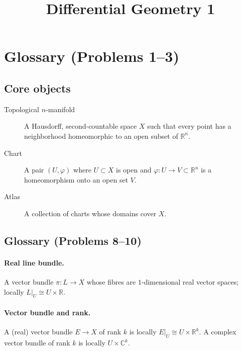 \documentclass[12pt,a4paper]{article}
\title{Differential Geometry 1}
\author{}
\date{}
\theoremstyle{plain}
\theoremstyle{definition}      %
\begin{document}
	\maketitle


\section*{Glossary (Problems 1--3)}

\subsection*{Core objects}

\begin{description}
	\item[Topological $n$-manifold]
	A Hausdorff, second-countable space $X$ such that every point has a neighborhood homeomorphic
	to an open subset of $\mathbb R^n$.
	
	\item[Chart]
	A pair $(U,\varphi)$ where $U\subset X$ is open and $\varphi:U\to V\subset\mathbb R^n$
	is a homeomorphism onto an open set $V$.
	
	\item[Atlas]
	A collection of charts whose domains cover $X$.
\end{description}




\subsection*{Glossary (Problems 8--10)}

\paragraph{\textbf{Real line bundle.}}
A vector bundle $\pi:L\to X$ whose fibres are $1$-dimensional real vector spaces; locally
$L|_U \cong U\times \mathbb{R}$.

\paragraph{\textbf{Vector bundle and rank.}}
A (real) vector bundle $E\to X$ of rank $k$ is locally $E|_U \cong U\times\mathbb{R}^k$.
A complex vector bundle of rank $k$ is locally $U\times\mathbb{C}^k$.
\end{document}
